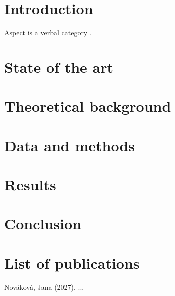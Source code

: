 \documentclass[department=kol, type=phd, language=english, gender=f, bib=acl]{upolthesis}
\begin{document}
\makefrontmatter

\chapter{Introduction}
Aspect is a verbal category \citep{Comrie:1976}.

\chapter{State of the art}
\chapter{Theoretical background}
\chapter{Data and methods}
\chapter{Results}
\chapter{Conclusion}

\chapter*{List of publications}
Nováková, Jana (2027).  ...

\thesisbibliography
\end{document}
